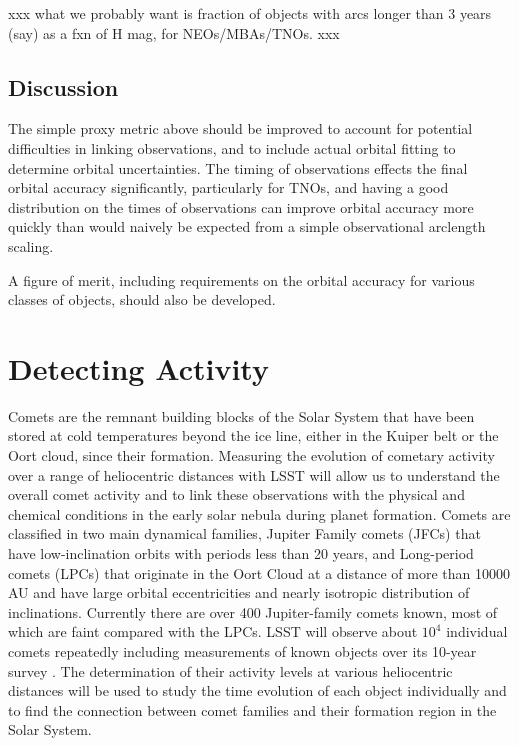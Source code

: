 xxx what we probably want is fraction of objects
with arcs longer than 3 years (say) as a fxn of 
H mag, for NEOs/MBAs/TNOs. xxx



\subsection{Discussion}
\label{sec:\secname:discussion}

The simple proxy metric above should be improved to account for
potential difficulties in linking observations, and to include actual
orbital fitting to determine orbital uncertainties. The timing of
observations effects the final orbital accuracy significantly,
particularly for TNOs, and having a good distribution on the times of
observations can improve orbital accuracy more quickly than would
naively be expected from a simple observational arclength scaling. 

A figure of merit, including requirements on the orbital accuracy for
various classes of objects, should also be developed. 

\navigationbar


\section{Detecting Activity}
\def\secname{\chpname:activity}\label{sec:\secname}


Comets are the remnant building blocks of the Solar System
that have been stored at cold temperatures beyond the ice
line, either in the Kuiper belt or the Oort cloud, since their
formation.  Measuring the evolution of cometary activity over
a range of heliocentric distances with LSST will allow us to
understand the overall comet activity and to link these
observations with the physical and chemical conditions in the
early solar nebula during planet formation.  Comets are
classified in two main dynamical families, Jupiter Family
comets (JFCs) that have low-inclination orbits with periods
less than 20 years, and Long-period comets (LPCs) that
originate in the Oort Cloud at a distance of more than 10000
AU and have large orbital eccentricities and nearly isotropic
distribution of inclinations.  Currently there are over 400
Jupiter-family comets known, most of which are faint compared
with the LPCs.  LSST will observe about $10^4$ individual
comets repeatedly including measurements of known objects over
its 10-year survey \citep{2010PhDT.......241S}. The
determination of their activity levels at various heliocentric
distances will be used to study the time evolution of each
object individually and to find the connection between comet
families and their formation region in the Solar System.

